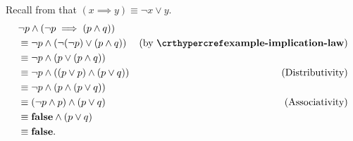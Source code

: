 \begin{questions}
    \item Recall from  that $(x \implies y) \equiv \lnot x \lor y$.
    \begin{align*}
        &\lnot p \land (\lnot p \implies (p \land q))\\
        &\equiv \lnot p \land (\lnot(\lnot p) \lor (p \land q)) & (\text{by } \myref{example-implication-law})\\
        &\equiv \lnot p \land (p \lor (p \land q))\\
        &\equiv \lnot p \land ((p \lor p) \land (p \lor q)) & (\text{Distributivity})\\
        &\equiv \lnot p \land (p \land (p \lor q))\\
        &\equiv (\lnot p \land p) \land (p \lor q) & (\text{Associativity})\\
        &\equiv \textbf{false} \land (p \lor q)\\
        &\equiv \textbf{false}.
    \end{align*}
\end{questions}
